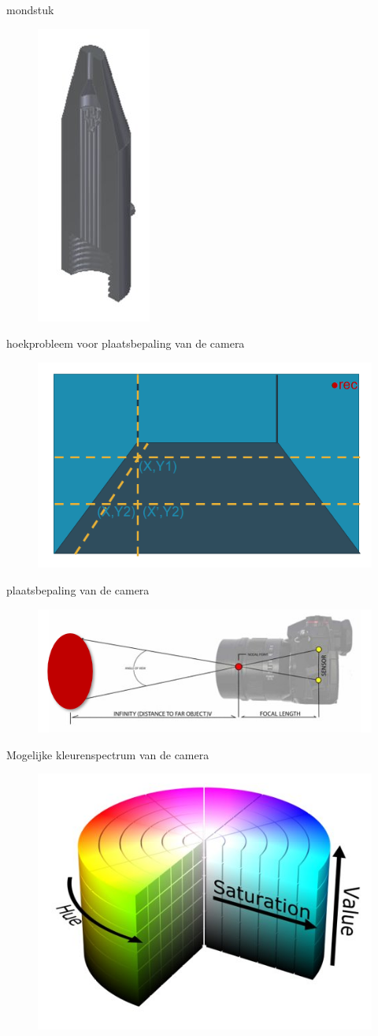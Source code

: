 \documentclass{kulakarticle}
\begin{document}
	mondstuk
	\begin{figure}
	\centering
	\includegraphics[width=.22\textwidth]{mondstuk}
	\end{figure}


	hoekprobleem voor plaatsbepaling van de camera
	\begin{figure}
		\centering
		\includegraphics[width=.62\textwidth]{hoekprobleem}
	\end{figure}

	plaatsbepaling van de camera
	\begin{figure}
		\centering
		\includegraphics[width=.62\textwidth]{plaatsbepaling}
	\end{figure}

	Mogelijke kleurenspectrum van de camera
	\begin{figure}
		\centering
		\includegraphics[width=.62\textwidth]{saturation}
	\end{figure}
\end{document}
